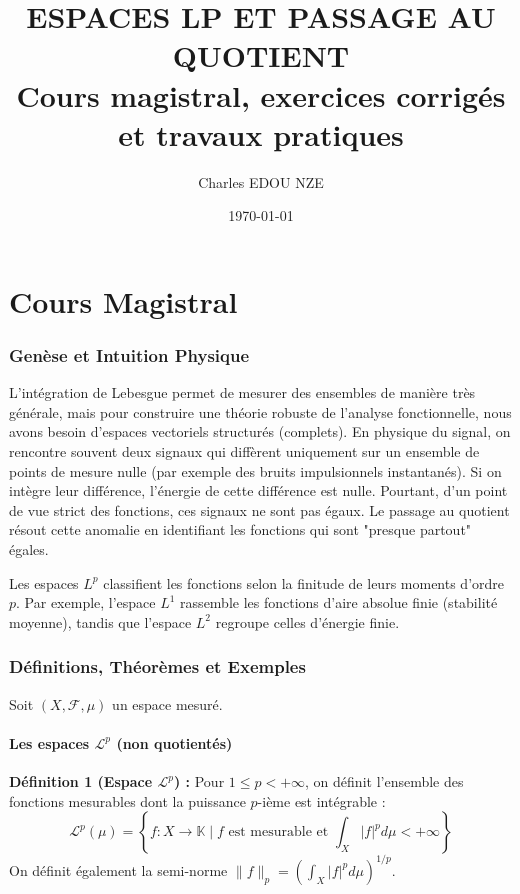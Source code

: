\documentclass[11pt,a4paper]{article}
\title{\Huge ESPACES LP ET PASSAGE AU QUOTIENT \\ \large Cours magistral, exercices corrigés et travaux pratiques}
\author{\Large Charles EDOU NZE}
\date{\today}
\begin{document}
\maketitle
\tableofcontents
\newpage

\part{Cours Magistral}

\section{Genèse et Intuition Physique}

L'intégration de Lebesgue permet de mesurer des ensembles de manière très générale, mais pour construire une théorie robuste de l'analyse fonctionnelle, nous avons besoin d'espaces vectoriels structurés (complets).
En physique du signal, on rencontre souvent deux signaux qui diffèrent uniquement sur un ensemble de points de mesure nulle (par exemple des bruits impulsionnels instantanés). Si on intègre leur différence, l'énergie de cette différence est nulle.
Pourtant, d'un point de vue strict des fonctions, ces signaux ne sont pas égaux. Le passage au quotient résout cette anomalie en identifiant les fonctions qui sont "presque partout" égales.

Les espaces $L^p$ classifient les fonctions selon la finitude de leurs moments d'ordre $p$. Par exemple, l'espace $L^1$ rassemble les fonctions d'aire absolue finie (stabilité moyenne), tandis que l'espace $L^2$ regroupe celles d'énergie finie.

\section{Définitions, Théorèmes et Exemples}

Soit $(X, \mathcal{F}, \mu)$ un espace mesuré.

\subsection{Les espaces $\mathcal{L}^p$ (non quotientés)}

\textbf{Définition 1 (Espace $\mathcal{L}^p$) :}
Pour $1 \le p < +\infty$, on définit l'ensemble des fonctions mesurables dont la puissance $p$-ième est intégrable :
$$\mathcal{L}^p(\mu) = \left\lbrace f : X \to \mathbb{K} \mid f \text{ est mesurable et } \int_X |f|^p d\mu < +\infty \right\rbrace$$
On définit également la semi-norme $\|f\|_p = \left( \int_X |f|^p d\mu \right)^{1/p}$.
\end{document}

